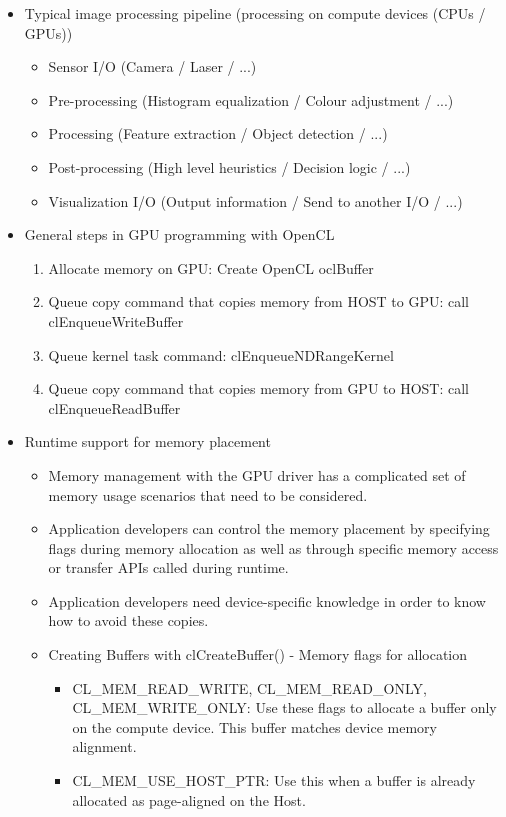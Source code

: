 \documentclass[paper=a4, fontsize=11pt]{scrartcl} %
\numberwithin{equation}{section} %
\numberwithin{figure}{section} %
\numberwithin{table}{section} %
\begin{document}
\begin{itemize}
  \item Typical image processing pipeline (processing on compute devices (CPUs / GPUs))
  \begin{itemize}
    \item Sensor I/O (Camera / Laser / ...)
    \item Pre-processing (Histogram equalization / Colour adjustment / ...)
    \item Processing (Feature extraction / Object detection / ...)
    \item Post-processing (High level heuristics / Decision logic / ...)
    \item Visualization I/O (Output information / Send to another I/O / ...)
  \end{itemize}
  \item General steps in GPU programming with OpenCL
  \begin{enumerate}
    \item Allocate memory on GPU: Create OpenCL oclBuffer
    \item Queue copy command that copies memory from HOST to GPU: call clEnqueueWriteBuffer
    \item Queue kernel task command: clEnqueueNDRangeKernel
    \item Queue copy command that copies memory from GPU to HOST: call clEnqueueReadBuffer
  \end{enumerate}
  \item Runtime support for memory placement
  \begin{itemize}
    \item Memory management with the GPU driver has a complicated set of memory usage scenarios that need to be considered.
    \item Application developers can control the memory placement by specifying flags during memory allocation as well as through specific memory access or transfer APIs called during runtime.
    \item Application developers need device-specific knowledge in order to know how to avoid these copies.
    \item Creating Buffers with clCreateBuffer() - Memory flags for allocation
    \begin{itemize}
      \item CL_MEM_READ_WRITE, CL_MEM_READ_ONLY, CL_MEM_WRITE_ONLY: Use these flags to allocate a buffer only on the compute device. This buffer matches device memory alignment.
      \item CL_MEM_USE_HOST_PTR: Use this when a buffer is already allocated as page-aligned on the Host.

\end{itemize}
\end{itemize}
\end{itemize}
\end{document}

